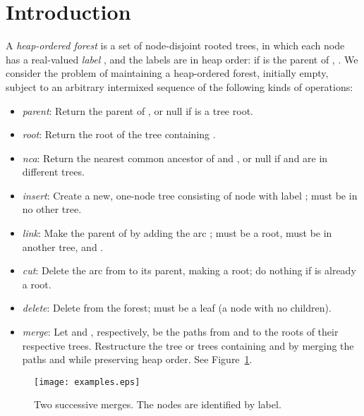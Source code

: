 \documentclass[twoside,leqno,twocolumn]{article}
\begin{document}
\thispagestyle{empty}

\setcounter{page}{1}
\section{Introduction}
\label{sec:intro}

A \emph{heap-ordered forest} is a set of node-disjoint rooted trees, in which each node  has a real-valued \emph{label} , and the labels are in heap order: if  is the parent of , .  We consider the problem of maintaining a heap-ordered forest, initially empty, subject to an arbitrary intermixed sequence of the following kinds of operations:

\begin{itemize}
\vspace{-.75mm}
\addtolength{\itemsep}{-1.75mm}
\item {\em parent}: Return the parent  of , or null if  is a tree root.
\item {\em root}: Return the root of the tree containing .
\item {\em nca}: Return the nearest common ancestor of  and , or null if  and  are in different trees.
\item {\em insert}: Create a new, one-node tree consisting of node  with label ;  must be in no other tree.
\item {\em link}: Make  the parent of  by adding the arc ;  must be a root,  must be in another tree,
and .
\item {\em cut}: Delete the arc from  to its parent, making  a root; do nothing if  is already a root.
\item {\em delete}: Delete  from the forest;  must be a leaf (a node with no children).
\item {\em merge}: Let  and , respectively, be the paths from  and  to the roots of their respective trees.  Restructure the tree or trees containing  and  by merging the paths  and  while preserving heap order. See Figure~\ref{fig:examples}.
\end{itemize}

\begin{figure}[h]
\addtolength{\abovecaptionskip}{-.5cm}
\begin{center}
\resizebox{1\textwidth}{!} {\texttt{[image: examples.eps]}}
\end{center}
\caption{\label{fig:examples} Two successive merges. The nodes are
identified by label.}
\end{figure}
\end{document}
